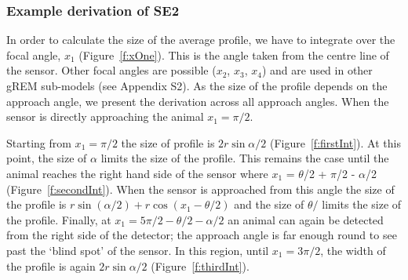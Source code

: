 \documentclass[a4paper,10pt,reqno,oneside]{amsart}
\begin{document}
\subsubsection{Example derivation of SE2}

In order to calculate the size of the average profile, we have to integrate over the focal angle, $x_1$ (Figure~\ref{f:xOne}). This is the angle taken from the centre line of the sensor. Other focal angles are possible ($x_2$, $x_3$, $x_4$) and are used in other gREM sub-models (see Appendix S2). As the size of the profile depends on the approach angle, we present the derivation across all approach angles. When the sensor is directly approaching the animal $x_1  = \pi/2$.

Starting from $x_1 = \pi/2$ the size of profile is $2r\sin \alpha/2$ (Figure~\ref{f:firstInt}). At this point, the size of $\alpha$ limits the size of the profile. This remains the case until the animal reaches the right hand side of the sensor where $x_1$  = $\theta$/2 + $\pi$/2 - $\alpha$/2 (Figure~\ref{f:secondInt}). When the sensor is approached from this angle the size of the profile is $r\sin( \alpha/2) + r\cos( x_1  - \theta/2)$ and the size of $\theta/$ limits the size of the profile. Finally, at $x_1  = 5\pi/2 - \theta/2  - \alpha/2$ an animal can again be detected from the right side of the detector; the approach angle is far enough round to see past the `blind spot' of the sensor. In this region, until $x_1  = 3\pi/2$, the width of the profile is again $2r\sin\alpha/2$ (Figure~\ref{f:thirdInt}). 

\end{document}
